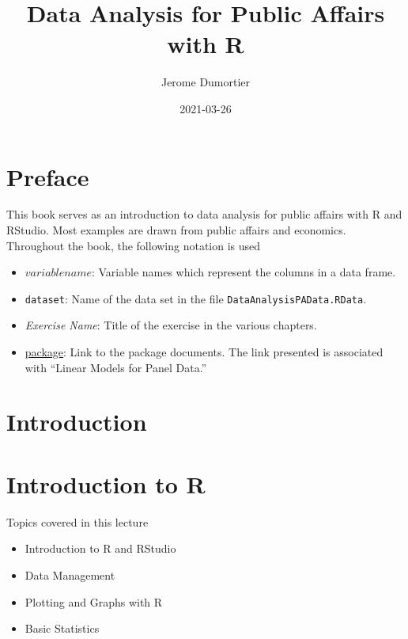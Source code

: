 \documentclass[
]{article}
\title{Data Analysis for Public Affairs with R}
\author{Jerome Dumortier}
\date{2021-03-26}
\providecommand{\tightlist}{%
  \setlength{\itemsep}{0pt}\setlength{\parskip}{0pt}}
\begin{document}
\maketitle

{
\setcounter{tocdepth}{2}
\tableofcontents
}
\hypertarget{preface}{%
\section{Preface}\label{preface}}

This book serves as an introduction to data analysis for public affairs with R and RStudio. Most examples are drawn from public affairs and economics. Throughout the book, the following notation is used

\begin{itemize}
\tightlist
\item
  \(variablename\): Variable names which represent the columns in a data frame.
\item
  \texttt{dataset}: Name of the data set in the file \texttt{DataAnalysisPAData.RData}.
\item
  \emph{Exercise Name}: Title of the exercise in the various chapters.
\item
  \href{https://cran.r-project.org/web/packages/plm/index.html}{package}: Link to the package documents. The link presented is associated with ``Linear Models for Panel Data.''
\end{itemize}

\hypertarget{introduction}{%
\section{Introduction}\label{introduction}}

\hypertarget{introduction-to-r}{%
\section{Introduction to R}\label{introduction-to-r}}

Topics covered in this lecture

\begin{itemize}
\tightlist
\item
  Introduction to R and RStudio
\item
  Data Management
\item
  Plotting and Graphs with R
\item
  Basic Statistics
\end{itemize}
\end{document}
